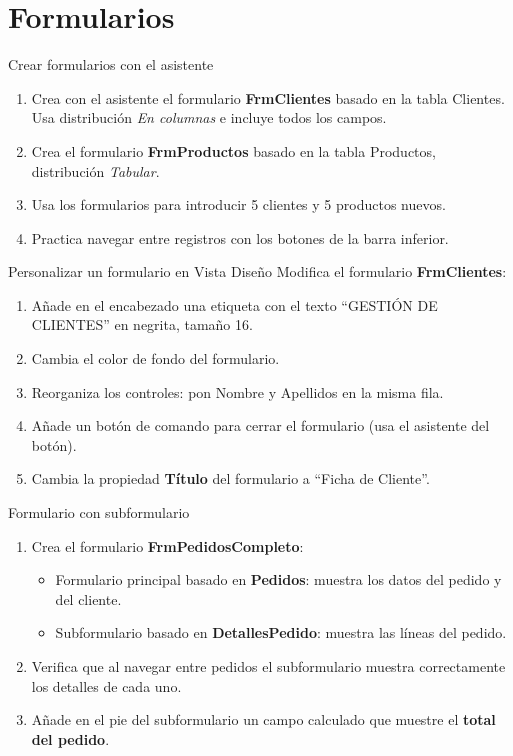 \documentclass[12pt,a4paper]{article}
\begin{document}
\section{Formularios}

\begin{practica}{Crear formularios con el asistente}
\begin{enumerate}
  \item Crea con el asistente el formulario \textbf{FrmClientes} basado en la tabla Clientes. Usa distribución \emph{En columnas} e incluye todos los campos.
  \item Crea el formulario \textbf{FrmProductos} basado en la tabla Productos, distribución \emph{Tabular}.
  \item Usa los formularios para introducir 5 clientes y 5 productos nuevos.
  \item Practica navegar entre registros con los botones de la barra inferior.
\end{enumerate}
\end{practica}

\begin{practica}{Personalizar un formulario en Vista Diseño}
Modifica el formulario \textbf{FrmClientes}:
\begin{enumerate}
  \item Añade en el encabezado una etiqueta con el texto ``GESTIÓN DE CLIENTES'' en negrita, tamaño 16.
  \item Cambia el color de fondo del formulario.
  \item Reorganiza los controles: pon Nombre y Apellidos en la misma fila.
  \item Añade un botón de comando para cerrar el formulario (usa el asistente del botón).
  \item Cambia la propiedad \textbf{Título} del formulario a ``Ficha de Cliente''.
\end{enumerate}
\end{practica}

\begin{practica}{Formulario con subformulario}
\begin{enumerate}
  \item Crea el formulario \textbf{FrmPedidosCompleto}:
    \begin{itemize}
      \item Formulario principal basado en \textbf{Pedidos}: muestra los datos del pedido y del cliente.
      \item Subformulario basado en \textbf{DetallesPedido}: muestra las líneas del pedido.
    \end{itemize}
  \item Verifica que al navegar entre pedidos el subformulario muestra correctamente los detalles de cada uno.
  \item Añade en el pie del subformulario un campo calculado que muestre el \textbf{total del pedido}.
\end{enumerate}
\end{practica}
\end{document}
